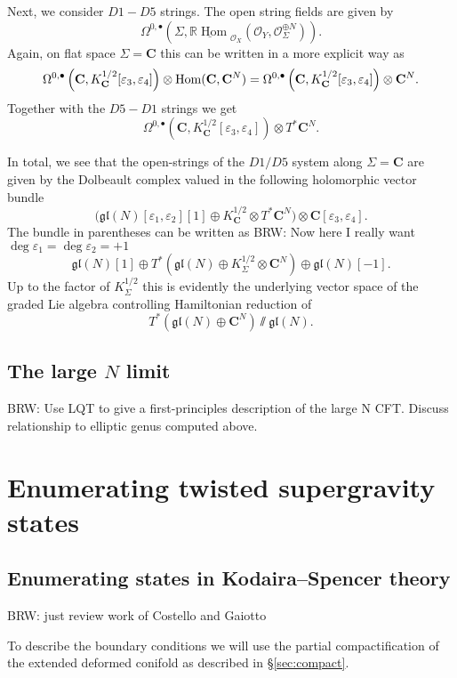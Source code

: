 \documentclass[11pt]{amsart}
\newcommand{\mc}{\mathcal}
\def\ep{\varepsilon}
\newcommand{\op}{\operatorname}
\def\bu{{\bullet}}
\def\cO{\mc O}
\def\lie#1{\ensuremath{\mathfrak{#1}}}
\newcommand\C{\mathbf{C}}
\def\brian#1{{\textcolor{blue!65!red}{BRW: {#1}}}}
\newcommand\beqn{\begin{equation}}
\newcommand\eeqn{\end{equation}}
\theoremstyle{thm}
\numberwithin{equation}{subsection}
\theoremstyle{def}
\theoremstyle{rem}
\begin{document}
Next, we consider $D1-D5$ strings. 
The open string fields are given by 
\beqn
\label{eqn:open15}
\Omega^{0,\bu}\left(\Sigma, \underline{\mathbb{R}\op{Hom}}_{\cO_X} \left(\cO_Y , \cO_\Sigma^{\oplus N}\right) \right) .
\eeqn
Again, on flat space $\Sigma = \C$ this can be written in a more explicit way as
\beqn\label{eqn:open15}
\Omega^{0,\bu}\left(\C, K^{1/2}_\C  [\ep_3,\ep_4]\right) \otimes {\rm Hom}(\C, \C^N) = \Omega^{0,\bu}\left(\C, K^{1/2}_\C  [\ep_3,\ep_4]\right) \otimes \C^N .
\eeqn
Together with the $D5-D1$ strings we get 
\beqn\label{eqn:open15a}
\Omega^{0,\bu}\left(\C, K^{1/2}_\C [\ep_3,\ep_4]\right)   \otimes T^*\C^N .
\eeqn

In total, we see that the open-strings of the $D1/D5$ system along $\Sigma = \C$ are given by the Dolbeault complex valued in the following holomorphic vector bundle
\beqn
\bigg(\lie{gl}(N)[\ep_1,\ep_2][1] \oplus K^{1/2}_\C \otimes T^*\C^N \bigg) \otimes \C[\ep_3,\ep_4] .
\eeqn
The bundle in parentheses can be written as 
\brian{Now here I really want $\deg{\ep_1}=\deg{\ep_2} = +1$}
\beqn
\lie{gl}(N)[1] \oplus T^* \left(\lie{gl}(N) \oplus K^{1/2}_\Sigma \otimes \C^N\right) \oplus \lie{gl}(N) [-1] .
\eeqn
Up to the factor of $K^{1/2}_\Sigma$ this is evidently the underlying vector space of the graded Lie algebra controlling Hamiltonian reduction of 
\beqn
T^*(\lie{gl}(N) \oplus \C^N) \sslash \lie{gl}(N) .
\eeqn

\subsection{The large $N$ limit}

\brian{Use LQT to give a first-principles description of the large N CFT. Discuss relationship to elliptic genus computed above.}

\section{Enumerating twisted supergravity states}

\subsection{Enumerating states in Kodaira--Spencer theory}

\brian{just review work of Costello and Gaiotto}

To describe the boundary conditions we will use the partial compactification of the extended deformed conifold as described in \S \ref{sec:compact}. 
\end{document}
